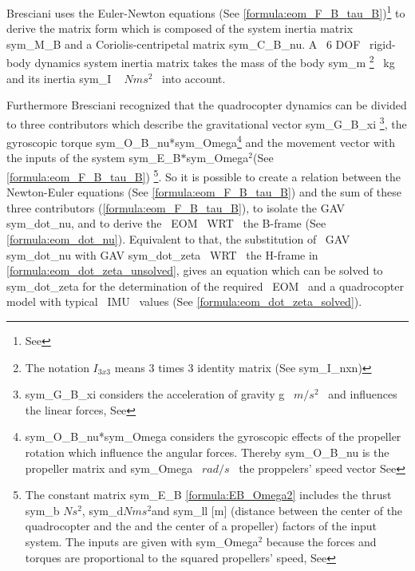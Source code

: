 Bresciani uses the Euler-Newton equations (See
\ref{formula:eom_F_B_tau_B})\footnote{See } to derive the matrix form which is composed
 of the system inertia matrix \gls{sym_M_B} and a Coriolis-centripetal
 matrix \gls{sym_C_B_nu}. A ~6 \gls{DOF}~ rigid-body dynamics system inertia
 matrix takes the mass of the body \gls{sym_m} \footnote{The notation \ensuremath{I_{3x3}}
 means 3 times 3 identity matrix (See \gls{sym_I_nxn})} ~\lbrack kg\rbrack~ and its inertia \gls{sym_I} ~\lbrack
 \ensuremath{Nms^2}\rbrack~ into account.

 Furthermore Bresciani recognized that the quadrocopter dynamics can be divided
 to three contributors which describe the gravitational vector
 \gls{sym_G_B_xi} \footnote{\gls{sym_G_B_xi} considers the acceleration
 of gravity g ~\lbrack \ensuremath{m/s^2}\rbrack~ and influences the linear
 forces, See }, the gyroscopic
 torque \gls{sym_O_B_nu}*\gls{sym_Omega}\footnote{\gls{sym_O_B_nu}*\gls{sym_Omega} considers the gyroscopic
 effects of the propeller rotation which influence the angular forces. Thereby
 \gls{sym_O_B_nu} is the propeller matrix and \gls{sym_Omega}~
 \lbrack\ensuremath{rad/s}\rbrack~ the proppelers' speed vector See } and the movement vector with the inputs of the
 system \gls{sym_E_B}\ensuremath{*}\gls{sym_Omega}\ensuremath{^2}(See \ref{formula:eom_F_B_tau_B}) \footnote{The
 constant matrix \gls{sym_E_B} \ref{formula:EB_Omega2} includes the thrust \gls{sym_b}
 \lbrack\ensuremath{Ns^2}\rbrack, \gls{sym_d}\lbrack\ensuremath{Nms^2}\rbrack and \gls{sym_l}l
 [m] (distance between the center of the quadrocopter and the
and the center of a propeller) factors of the input system. The inputs are given
with \gls{sym_Omega}\ensuremath{^2} because the forces and torques are proportional to the
squared propellers' speed, See
 }.
 So it is possible to
 create a relation between the Newton-Euler equations (See
 \ref{formula:eom_F_B_tau_B}) and the sum of these three contributors
 (\ref{formula:eom_F_B_tau_B}), to isolate the \gls{GAV} \gls{sym_dot_nu}, and to
 derive the ~\gls{EOM}~ \gls{WRT}~ the B-frame (See \ref{formula:eom_dot_nu}).
\newpage 
Equivalent to that, the substitution of ~\gls{GAV}~ \gls{sym_dot_nu} with \gls{GAV}
 \gls{sym_dot_zeta} ~\gls{WRT}~ the H-frame in
 \ref{formula:eom_dot_zeta_unsolved}, gives an equation which can be
solved to \gls{sym_dot_zeta} for the determination of the required ~\gls{EOM}~
and a quadrocopter model with typical ~\gls{IMU}~ values (See
\ref{formula:eom_dot_zeta_solved}).

